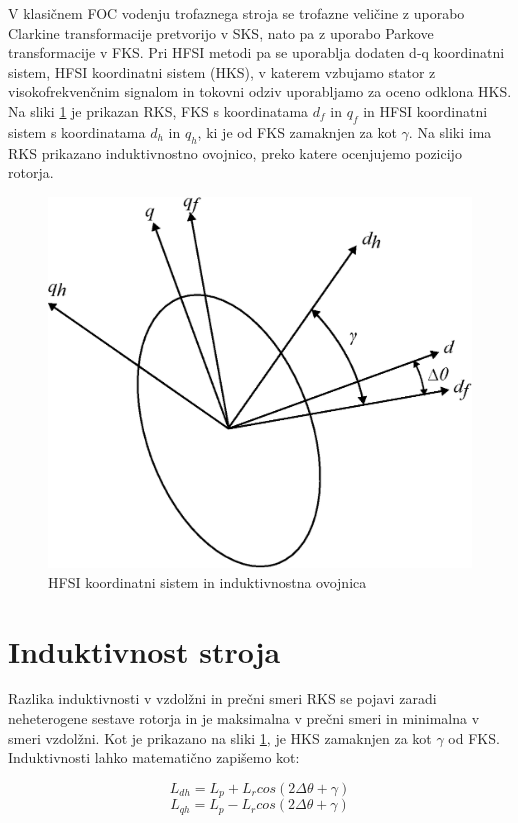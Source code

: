 \documentclass[a4paper,twoside,openright,12pt,slovene]{book}
\begin{document}
V klasičnem FOC vodenju trofaznega stroja se trofazne veličine z uporabo Clarkine transformacije pretvorijo v SKS, nato pa z uporabo Parkove transformacije v FKS. Pri HFSI metodi pa se uporablja
dodaten d-q koordinatni sistem, HFSI koordinatni sistem (HKS), v katerem vzbujamo stator z visokofrekvenčnim signalom in tokovni odziv uporabljamo za oceno odklona HKS. Na sliki
\ref{koordinatniSistem} je prikazan RKS, FKS s koordinatama $d_f$ in $q_f$ in HFSI koordinatni sistem s koordinatama $d_h$ in $q_h$, ki je od FKS zamaknjen za kot $\gamma$. Na sliki ima RKS prikazano
induktivnostno ovojnico, preko katere ocenjujemo pozicijo rotorja.

\begin{figure}[!htbp]
    \centering
    \includegraphics[width=0.7\columnwidth]{Slike/Inkscape/koordinatniSistem.eps}
    \caption{\label{koordinatniSistem} HFSI koordinatni sistem in induktivnostna ovojnica}
\end{figure}

\section{Induktivnost stroja}
Razlika induktivnosti v vzdolžni in prečni smeri RKS se pojavi zaradi neheterogene sestave rotorja in je maksimalna v prečni smeri in minimalna v smeri vzdolžni. Kot je prikazano na sliki
\ref{koordinatniSistem}, je HKS zamaknjen za kot $\gamma$ od FKS. Induktivnosti lahko matematično zapišemo kot:

\begin{equation}
    L_{dh} = L_p + L_r cos(2\Delta\theta + \gamma)
\end{equation}
\begin{equation}
    L_{qh} = L_p - L_r cos(2\Delta\theta + \gamma)
\end{equation}
\end{document}
